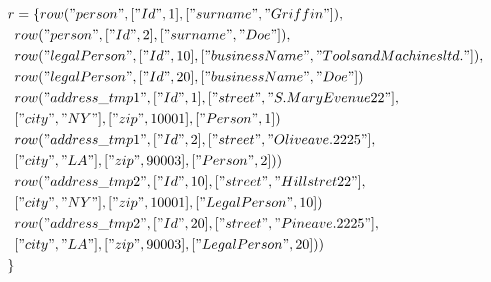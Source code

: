 \documentclass[11pt]{article}
\begin{document}
\begin{align*}
r &= \{ row("person", ["Id", 1], ["surname", "Griffin"]), \\
& row("person", ["Id", 2], ["surname", "Doe"]), \\
& row("legalPerson", ["Id", 10], ["businessName", "Tools and Machines ltd."]), \\
& row("legalPerson", ["Id", 20], ["businessName", "Doe"])\\
& row("address\_tmp1", ["Id", 1], ["street", "S. Mary Evenue 22"], \\ 
& ["city", "NY"], ["zip", 10001], ["Person", 1]) \\
& row("address\_tmp1", ["Id", 2], ["street", "Olive ave. 2225"], \\
& ["city", "LA"], ["zip", 90003], ["Person", 2]) )\\
& row("address\_tmp2", ["Id", 10], ["street", "Hill stret 22"], \\
& ["city", "NY"], ["zip", 10001], ["LegalPerson", 10]) \\
& row("address\_tmp2", ["Id", 20], ["street", "Pine ave. 2225"], \\
& ["city", "LA"], ["zip", 90003], ["LegalPerson", 20]) )\\
\}
\end{align*}
\end{document}
